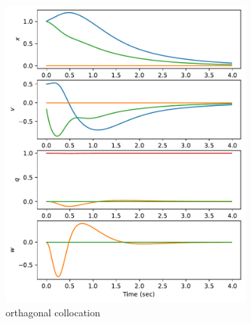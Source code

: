 \documentclass[]{article}
\begin{document}
\begin{figure}[H]
	\centering
	\begin{subfigure}[b]{0.3\textwidth}
		\centering
		\includegraphics[width=\textwidth]{figures/statex1z1vx1.pdf}
		\caption{orthagonal collocation}
	\end{subfigure}%
	\begin{subfigure}[b]{0.3\textwidth}
		\centering

\end{subfigure}
\end{figure}
\end{document}
